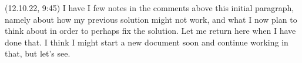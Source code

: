 \documentclass{report}
\begin{document}

(12.10.22, 9:45) I have I few notes in the comments above this initial paragraph, namely about how my previous solution might not work, and what I now plan to think about in order to perhaps fix the solution. Let me return here when I have done that. I think I might start a new document soon and continue working in that, but let's see. 

\end{document}
